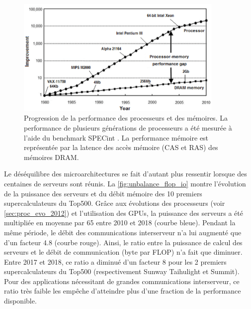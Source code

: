             \begin{figure}             \center             \includegraphics[width=10cm]{images/cpu_cpu_vs_memory.png}             \caption{\label{pic:cpuvsmemory2} Progression de la performance des processeurs et des mémoires. La performance de plusieurs générations de processeurs a été mesurée à l'aide du benchmark SPECint \cite{Efnusheva2017ASO}. La performance mémoire est représentée par la latence des accès mémoire (CAS et RAS) des mémoires DRAM.}
            \end{figure}
            
            Le déséquilibre des microarchitectures se fait d'autant plus ressentir lorsque des centaines de serveurs sont réunis. La \autoref{fig:unbalance_flop_io} montre l'évolution de la puissance des serveurs et du débit mémoire des 10 premiers supercalculateurs du Top500. Grâce aux évolutions des processeurs (voir \autoref{sec:proc_evo_2012}) et l'utilisation des GPUs, la puissance des serveurs a été multipliée en moyenne par 65 entre 2010 et 2018 (courbe bleue). Pendant la même période, le débit des communications interserveur n'a lui augmenté que d'un facteur 4.8 (courbe rouge). Ainsi, le ratio entre la puissance de calcul des serveurs et le débit de communication (byte par \gls{FLOP}) n'a fait que diminuer. Entre 2017 et 2018, ce ratio a diminué d'un facteur 8 pour les 2 premiers supercalculateurs du Top500 (respectivement Sunway Taihulight et Summit). Pour des applications nécessitant de grandes communications interserveur, ce ratio très faible les empêche d'atteindre plus d’une fraction de la performance disponible.
            
